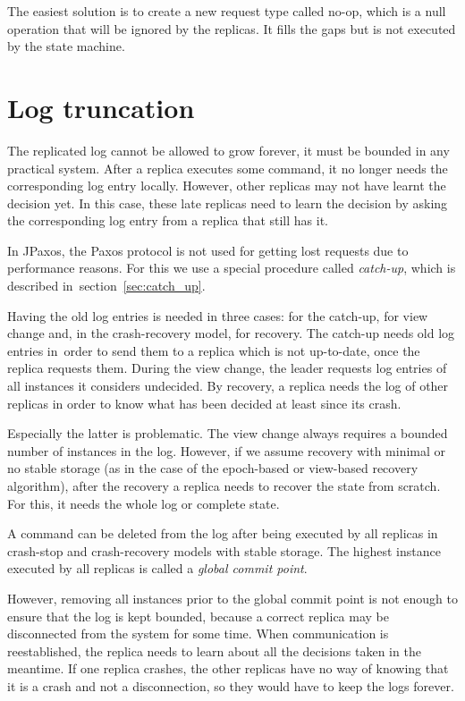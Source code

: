The easiest solution is to create a new request type called no-op, which is a null operation that will be ignored by the replicas. It fills the gaps but is not executed by the state machine.

\section{Log truncation}

The replicated log cannot be allowed to grow forever, it must be bounded in any practical system. After a replica executes some command, it no longer needs the corresponding log entry locally. However, other replicas may not have learnt the decision yet. \linebreak In this case, these late replicas need to learn the decision by asking the corresponding log entry from a replica that still has it.

In JPaxos, the Paxos protocol is not used for getting lost requests due to performance reasons. For this we use a special procedure called \textit{catch-up}, which is described in~section~\ref{sec:catch_up}.

Having the old log entries is needed in three cases: for the catch-up, for view change and, in the crash-recovery model, for recovery.
The catch-up needs old log entries in~order to send them to a replica which is not up-to-date, once the replica requests them.
During the view change, the leader requests log entries of all instances it considers undecided.
By recovery, a replica needs the log of other replicas in order to know what has been decided at least since its crash.

Especially the latter is problematic. The view change always requires a bounded number of instances in the log. However, if we assume recovery with minimal or no stable storage (as in the case of the epoch-based or view-based recovery algorithm), after the recovery a replica needs to recover the state from scratch. For this, it needs the whole log or complete state.


A command can be deleted from the log after being executed by all replicas in crash-stop and crash-recovery models with stable storage. The highest instance executed by all replicas is called a \emph{global commit point}.

However, removing all instances prior to the global commit point is not enough to ensure that the log is kept bounded, because a correct replica may be disconnected from the system for some time. When communication is reestablished, the replica needs to learn about all the decisions taken in the meantime. If one replica crashes, the other replicas have no way of knowing that it is a crash and not a disconnection, so they would have to keep the logs forever.

